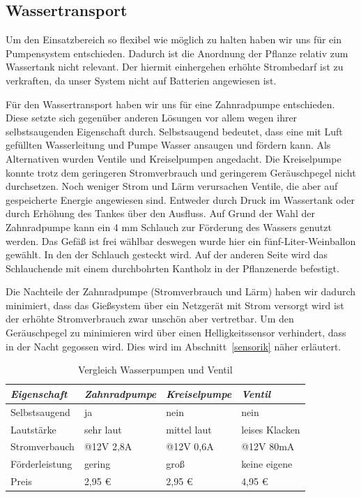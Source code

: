 \documentclass[]{IEEEtran}
\begin{document}
\subsection{Wassertransport}
Um den Einsatzbereich so flexibel wie möglich zu halten haben wir uns für ein Pumpensystem entschieden. 
Dadurch ist die Anordnung der Pflanze relativ zum Wassertank nicht relevant. 
Der hiermit einhergehen erhöhte Strombedarf ist zu verkraften, da unser System nicht auf Batterien angewiesen ist.

Für den Wassertransport haben wir uns für eine Zahnradpumpe entschieden.
Diese setzte sich gegenüber anderen Lösungen vor allem wegen ihrer selbstsaugenden Eigenschaft durch.
Selbstsaugend bedeutet, dass eine mit Luft gefüllten Wasserleitung und Pumpe Wasser ansaugen und fördern kann. 
Als Alternativen wurden Ventile und Kreiselpumpen angedacht.
Die Kreiselpumpe konnte trotz dem geringeren Stromverbrauch und geringerem Geräuschpegel nicht durchsetzen. 
Noch weniger Strom und Lärm verursachen Ventile, die aber auf gespeicherte Energie angewiesen sind.  
Entweder durch Druck im Wassertank oder durch Erhöhung des Tankes über den Ausfluss. 
Auf Grund der Wahl der Zahnradpumpe kann ein 4 mm Schlauch zur Förderung des Wassers genutzt werden. 
Das Gefäß ist frei wählbar deswegen wurde hier ein fünf-Liter-Weinballon gewählt. 
In den der Schlauch gesteckt wird. 
Auf der anderen Seite wird das Schlauchende mit einem durchbohrten Kantholz in der Pflanzenerde befestigt.
	
Die Nachteile der Zahnradpumpe (Stromverbrauch und Lärm) haben wir dadurch minimiert, dass das Gießsystem über ein Netzgerät mit Strom versorgt wird ist der erhöhte Stromverbrauch zwar unschön aber vertretbar. 
Um den Geräuschpegel zu minimieren wird über einen Helligkeitssensor verhindert, dass in der Nacht gegossen wird. 
Dies wird im Abschnitt~\ref{sensorik} näher erläutert.
	
\begin{table}
	\centering

		\onehalfspacing
	\footnotesize
	\caption{Vergleich Wasserpumpen und Ventil}
	\label{Vergleich zwischen Wasserpumpen und Ventil}
		\begin{tabular}{|l|lll|}
		\hline
		\textit{Eigenschaft} & \textit{Zahnradpumpe} & \textit{Kreiselpumpe} & \textit{Ventil} \\
		\hline
		Selbstsaugend	&ja	&nein &nein\\		
		Lautstärke		&sehr laut	&mittel laut	&leises Klacken\\
		Stromverbauch	&@12V 2,8A	&@12V 0,6A	&@12V 80mA\\
		Förderleistung	&gering		&groß		&keine eigene\\
		Preis			&2,95 \euro	& 2,95 \euro	&	4,95 \euro\\
		\hline		
		\end{tabular}
		
\end{table}	
	
\end{document}
